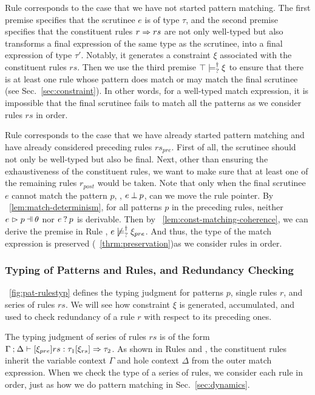 \documentclass[runningheads,envcountsame,a4paper]{llncs}
\begin{document}
Rule \TMatchZPre corresponds to the case that we have not started pattern
matching. The first premise specifies that the scrutinee $e$ is of type $\tau$,
and the second premise specifies that the constituent rules $r \Rightarrow rs$ are not only
well-typed but also transforms a final expression of the same type as the
scrutinee, into a final expression of type $\tau'$. Notably, it generates a
constraint $\xi$ associated with the constituent rules $rs$. Then we use the
third premise $\top \models_{?}^{\dag} \xi$ to ensure that there is at least
one rule whose pattern does match or may match the final scrutinee (see
Sec.~\ref{sec:constraint}). In other words, for a well-typed match expression,
it is impossible that the final scrutinee fails to match all the patterns as we
consider rules $rs$ in order.

Rule \TMatchNZPre corresponds to the case that we have already started pattern
matching and have already considered preceding rules $rs_{pre}$. First of all,
the scrutinee should not only be well-typed but also be final. Next, other than
ensuring the exhaustiveness of the constituent rules, we want to make sure that
at least one of the remaining rules $r_{post}$ would be taken. Note
that only when the final scrutinee $e$ cannot match the pattern $p$, \ie,
$e \mathbin{\bot} p$, can we move the rule pointer. By
\lemmaname~\ref{lem:match-determinism}, for all patterns $p$ in the preceding
rules, neither $\hpatmatch{e}{p}{\theta}$ nor $e \mathbin{?} p$ is derivable.
Then by \lemmaname~\ref{lem:const-matching-coherence}, we can derive the premise
in Rule \TMatchNZPre, $e \not\models_{?}^{\dag} \xi_{pre}$. And thus, the type of
the match expression is preserved (\theoremname~\ref{thrm:preservation})as we consider rules in order.

\subsubsection{Typing of Patterns and Rules, and Redundancy Checking}
\label{sec:pattyp}


\figurename~\ref{fig:pat-rulestyp} defines the typing judgment for patterns $p$,
single rules $r$, and series of rules $rs$. We will see how constraint $\xi$ is
generated, accumulated, and used to check redundancy of a rule $r$ with respect
to its preceding ones.

The typing judgment of series of rules $rs$ is of the form
$\Gamma \mathbin{;} \Delta \vdash [\xi_{pre}] rs : \tau_1 [\xi_{rs}] \Rightarrow \tau_2$. As shown
in Rules \TMatchZPre and \TMatchNZPre, the constituent rules inherit the
variable context $\Gamma$ and hole context $\Delta$ from the outer match
expression. When we check the type of a series of rules, we consider each rule
in order, just as how we do pattern matching in Sec.~\ref{sec:dynamics}.
\end{document}
